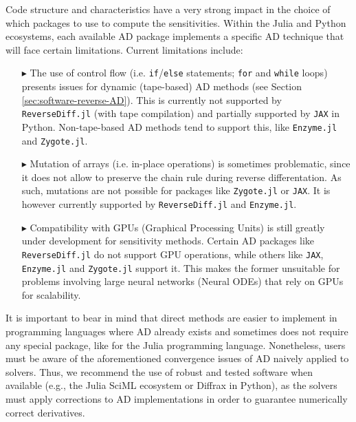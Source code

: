 Code structure and characteristics have a very strong impact in the choice of which packages to use to compute the sensitivities. 
Within the Julia and Python ecosystems, each available AD package implements a specific AD technique that will face certain limitations.
Current limitations include:
\begin{enumerate}
    \item[$ \blacktriangleright$] The use of control flow (i.e. \texttt{if}/\texttt{else} statements; \texttt{for} and \texttt{while} loops) presents issues for dynamic (tape-based) AD methods (see Section \ref{sec:software-reverse-AD}). 
    This is currently not supported by \texttt{ReverseDiff.jl} (with tape compilation) and partially supported by \texttt{JAX} in Python. 
    Non-tape-based AD methods tend to support this, like \texttt{Enzyme.jl} and \texttt{Zygote.jl}.
    \item[$ \blacktriangleright$] Mutation of arrays (i.e. in-place operations) is sometimes problematic, since it does not allow to preserve the chain rule during reverse differentation. As such, mutations are not possible for packages like \texttt{Zygote.jl} or \texttt{JAX}. It is however currently supported by \texttt{ReverseDiff.jl} and \texttt{Enzyme.jl}.
    \item[$ \blacktriangleright$] Compatibility with GPUs (Graphical Processing Units) is still greatly under development for sensitivity methods. 
    Certain AD packages like \texttt{ReverseDiff.jl} do not support GPU operations, while others like \texttt{JAX}, \texttt{Enzyme.jl} and \texttt{Zygote.jl} support it. 
    This makes the former unsuitable for problems involving large neural networks (Neural ODEs) that rely on GPUs for scalability.
\end{enumerate}

It is important to bear in mind that direct methods are easier to implement in programming languages where AD already exists and sometimes does not require any special package, like for the Julia programming language.
Nonetheless, users must be aware of the aforementioned convergence issues of AD naively applied to solvers. 
Thus, we recommend the use of robust and tested software when available (e.g., the Julia SciML ecosystem or Diffrax in Python), as the solvers must apply corrections to AD implementations in order to guarantee numerically correct derivatives.

